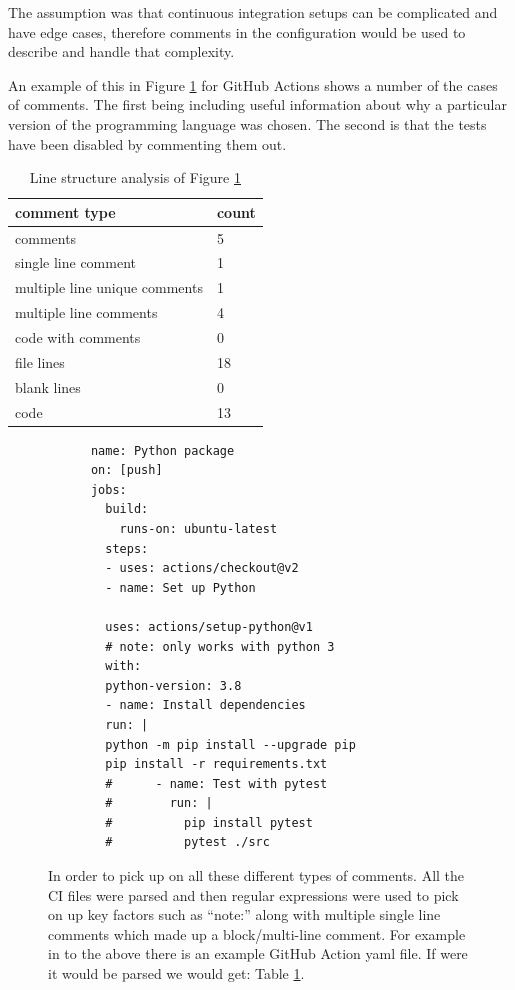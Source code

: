 \documentclass[10pt,conference]{IEEEtran}
\begin{document}
The assumption was that continuous integration setups can be complicated and have edge cases, therefore comments in the configuration would be used to describe and handle that complexity.

An example of this in Figure \ref{fig:example_configuration_file} for GitHub Actions shows a number of the cases of comments. The first being including useful information about why a particular version of the programming language was chosen. The second is that the tests have been disabled by commenting them out. 

\begin{table}[!b]
  \begin{tabular}{|l|l|}
    \hline
    \textbf{comment type} & \textbf{count} \\ \hline
    comments & 5 \\ \hline
    single line comment & 1 \\ \hline
    multiple line unique comments & 1 \\ \hline
    multiple line comments  & 4 \\ \hline
    code with comments & 0 \\ \hline
    file lines & 18 \\ \hline
    blank lines & 0 \\ \hline
    code & 13 \\ \hline
  \end{tabular}
  \caption{Line structure analysis of Figure \ref{fig:example_configuration_file}}
  \label{table:example_structure_data}
\end{table}

\begin{figure}[!ht]
    
    \begin{verbatim}
      name: Python package
      on: [push]
      jobs:
        build:
          runs-on: ubuntu-latest
        steps:
        - uses: actions/checkout@v2
        - name: Set up Python
        
        uses: actions/setup-python@v1
        # note: only works with python 3
        with:
        python-version: 3.8
        - name: Install dependencies
        run: |
        python -m pip install --upgrade pip
        pip install -r requirements.txt
        #      - name: Test with pytest
        #        run: |
        #          pip install pytest
        #          pytest ./src
    \end{verbatim}
    \caption{In order to pick up on all these different types of comments. All the CI files were parsed and then regular expressions were used to pick on up key factors such as \enquote{note:} along with multiple single line comments which made up a block/multi-line comment. For example in to the above there is an example GitHub Action yaml file. If were it would be parsed we would get: Table \ref{table:example_structure_data}.}
    \label{fig:example_configuration_file}
\end{figure}
\end{document}
